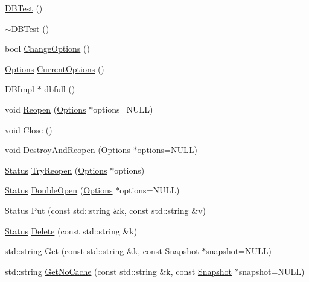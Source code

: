 \begin{DoxyCompactItemize}
\item 
\hyperlink{classleveldb_1_1_d_b_test_afc6fc9512e900de6ee10c5db15b22930}{D\+B\+Test} ()
\item 
\hyperlink{classleveldb_1_1_d_b_test_a2268045d59c3a74bba03877819e36b55}{$\sim$\+D\+B\+Test} ()
\item 
bool \hyperlink{classleveldb_1_1_d_b_test_a587534fe403016f15cf1997ef7a40836}{Change\+Options} ()
\item 
\hyperlink{structleveldb_1_1_options}{Options} \hyperlink{classleveldb_1_1_d_b_test_a68db410e16195a3b67822bec05c06547}{Current\+Options} ()
\item 
\hyperlink{classleveldb_1_1_d_b_impl}{D\+B\+Impl} $\ast$ \hyperlink{classleveldb_1_1_d_b_test_a67de35d247ea077c1e4fdf2a7a0f0514}{dbfull} ()
\item 
void \hyperlink{classleveldb_1_1_d_b_test_a38170a082cbc71fb446408ff5634c797}{Reopen} (\hyperlink{structleveldb_1_1_options}{Options} $\ast$options=N\+U\+L\+L)
\item 
void \hyperlink{classleveldb_1_1_d_b_test_aee76446bbb9c34cdb1ae00318689aead}{Close} ()
\item 
void \hyperlink{classleveldb_1_1_d_b_test_ab798a43e7feab6dddc8fa1eb7a5f61f6}{Destroy\+And\+Reopen} (\hyperlink{structleveldb_1_1_options}{Options} $\ast$options=N\+U\+L\+L)
\item 
\hyperlink{classleveldb_1_1_status}{Status} \hyperlink{classleveldb_1_1_d_b_test_aee588b2d13db6be2a651a8fabeac5c79}{Try\+Reopen} (\hyperlink{structleveldb_1_1_options}{Options} $\ast$options)
\item 
\hyperlink{classleveldb_1_1_status}{Status} \hyperlink{classleveldb_1_1_d_b_test_aaf18040f36d28207e2f56c35ebccf360}{Double\+Open} (\hyperlink{structleveldb_1_1_options}{Options} $\ast$options=N\+U\+L\+L)
\item 
\hyperlink{classleveldb_1_1_status}{Status} \hyperlink{classleveldb_1_1_d_b_test_a5ec1a1d5ecc1744f325159eb81e46514}{Put} (const std\+::string \&k, const std\+::string \&v)
\item 
\hyperlink{classleveldb_1_1_status}{Status} \hyperlink{classleveldb_1_1_d_b_test_a25716ec93d525adbeea8ff71e8f3a9f4}{Delete} (const std\+::string \&k)
\item 
std\+::string \hyperlink{classleveldb_1_1_d_b_test_a6af558e1fca4a9f1bbf86d72d3d4aa6c}{Get} (const std\+::string \&k, const \hyperlink{classleveldb_1_1_snapshot}{Snapshot} $\ast$snapshot=N\+U\+L\+L)
\item 
std\+::string \hyperlink{classleveldb_1_1_d_b_test_a3e3e12e84828f57e6e2aec4e998f03fe}{Get\+No\+Cache} (const std\+::string \&k, const \hyperlink{classleveldb_1_1_snapshot}{Snapshot} $\ast$snapshot=N\+U\+L\+L)

\end{DoxyCompactItemize}
